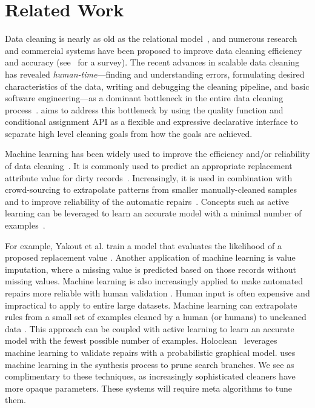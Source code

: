 \section{Related Work}
Data cleaning is nearly as old as the relational model~\cite{codd1970relational}, and numerous research and  commercial systems have been proposed to improve data cleaning efficiency and accuracy (see~\cite{rahm2000data} for a survey).
The recent advances in scalable data cleaning~\cite{wang1999sample, DBLP:journals/debu/KrishnanWFGKM015, khayyat2015bigdansing, altowim2014progressive, he2016interactive, rekatsinas2017holoclean} has revealed {\it human-time}---finding and understanding errors, formulating desired characteristics of the data, writing and debugging the cleaning pipeline, and basic software engineering---as a dominant bottleneck in the entire data cleaning process~\cite{krishnan2016hilda}.  
\sys aims to address this bottleneck by using the quality function and conditional assignment API as a flexible and expressive declarative interface to separate high level cleaning goals from how the goals are achieved.  

 Machine learning has been widely used to improve the efficiency and/or reliability of data cleaning~\cite{DBLP:journals/pvldb/YakoutENOI11,yakout2013don,gokhale2014corleone}.
It is commonly used to predict an appropriate replacement attribute value for dirty records~\cite{yakout2013don}.
Increasingly, it is used in combination with crowd-sourcing to extrapolate patterns from smaller manually-cleaned samples~\cite{gokhale2014corleone,DBLP:journals/pvldb/YakoutENOI11} and to improve reliability of the automatic repairs~\cite{DBLP:journals/pvldb/YakoutENOI11}.
Concepts such as active learning can be leveraged to learn an accurate model with a minimal number of examples~\cite{DBLP:journals/pvldb/MozafariSFJM14}.

For example, Yakout et al. train a model that evaluates the likelihood of a proposed replacement value \cite{yakout2013don}.
Another application of machine learning is value imputation, where a missing value is predicted based on those records without missing values.
Machine learning is also increasingly applied to make automated repairs more reliable with human validation \cite{DBLP:journals/pvldb/YakoutENOI11}.
 Human input is often expensive and impractical to apply to entire large datasets.
Machine learning can extrapolate rules from a small set of examples cleaned by a human (or humans) to uncleaned data \cite{gokhale2014corleone, DBLP:journals/pvldb/YakoutENOI11}.
This approach can be coupled with active learning \cite{DBLP:journals/pvldb/MozafariSFJM14} to learn an accurate model with the fewest possible number of examples.
Holoclean~\cite{rekatsinas2017holoclean} leverages machine learning to validate repairs with a probabilistic graphical model.
 \sys uses machine learning in the synthesis process to prune search branches.
 We see \sys as complimentary to these techniques, as increasingly sophisticated cleaners have more opaque parameters.
 These systems will require meta algorithms to tune them.


